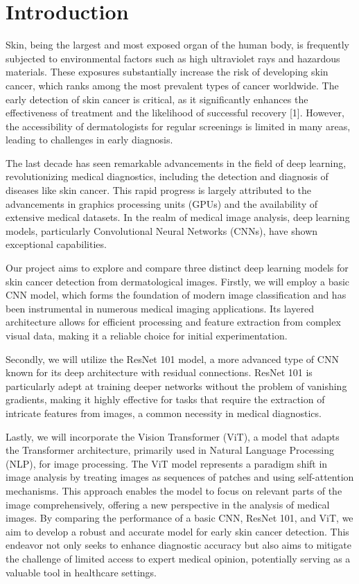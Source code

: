 \documentclass[conference]{IEEEtran}
\begin{document}
\section{Introduction}

Skin, being the largest and most exposed organ of the human body, is frequently subjected to environmental factors such as high ultraviolet rays and hazardous materials. These exposures substantially increase the risk of developing skin cancer, which ranks among the most prevalent types of cancer worldwide. The early detection of skin cancer is critical, as it significantly enhances the effectiveness of treatment and the likelihood of successful recovery [1]. However, the accessibility of dermatologists for regular screenings is limited in many areas, leading to challenges in early diagnosis.

The last decade has seen remarkable advancements in the field of deep learning, revolutionizing medical diagnostics, including the detection and diagnosis of diseases like skin cancer. This rapid progress is largely attributed to the advancements in graphics processing units (GPUs) and the availability of extensive medical datasets. In the realm of medical image analysis, deep learning models, particularly Convolutional Neural Networks (CNNs), have shown exceptional capabilities.

Our project aims to explore and compare three distinct deep learning models for skin cancer detection from dermatological images. Firstly, we will employ a basic CNN model, which forms the foundation of modern image classification and has been instrumental in numerous medical imaging applications. Its layered architecture allows for efficient processing and feature extraction from complex visual data, making it a reliable choice for initial experimentation.

Secondly, we will utilize the ResNet 101 model, a more advanced type of CNN known for its deep architecture with residual connections. ResNet 101 is particularly adept at training deeper networks without the problem of vanishing gradients, making it highly effective for tasks that require the extraction of intricate features from images, a common necessity in medical diagnostics.

Lastly, we will incorporate the Vision Transformer (ViT), a model that adapts the Transformer architecture, primarily used in Natural Language Processing (NLP), for image processing. The ViT model represents a paradigm shift in image analysis by treating images as sequences of patches and using self-attention mechanisms. This approach enables the model to focus on relevant parts of the image comprehensively, offering a new perspective in the analysis of medical images. By comparing the performance of a basic CNN, ResNet 101, and ViT, we aim to develop a robust and accurate model for early skin cancer detection. This endeavor not only seeks to enhance diagnostic accuracy but also aims to mitigate the challenge of limited access to expert medical opinion, potentially serving as a valuable tool in healthcare settings.
\end{document}
